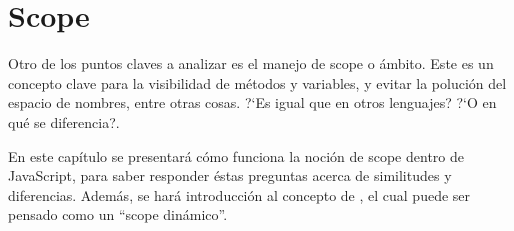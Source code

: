 \chapter{Scope} %

\label{ch:scope} %

Otro de los puntos claves a analizar es el manejo de scope o ámbito. Este es un concepto clave para la visibilidad de métodos y variables, y evitar la polución del espacio de nombres, entre otras cosas. ?`Es igual que en otros lenguajes? ?`O en qué se diferencia?.

En este capítulo se presentará cómo funciona la noción de scope dentro de JavaScript, para saber responder éstas preguntas acerca de similitudes y diferencias. Además, se hará introducción al concepto de , el cual puede ser pensado como un "`scope dinámico"'.





